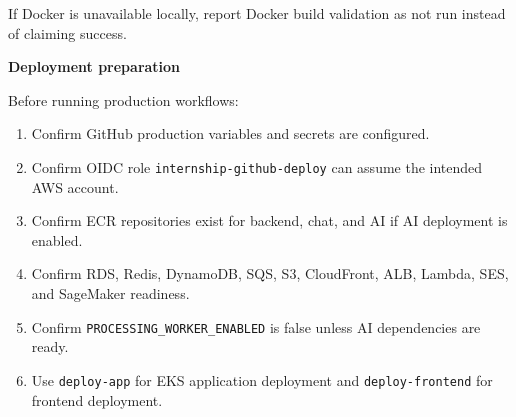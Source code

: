 \begin{Shaded}
\begin{Highlighting}[]
  \VariableTok{$(}\VariableTok{)}
 
 
 
  
\end{Highlighting}
\end{Shaded}

If Docker is unavailable locally, report Docker build validation as not
run instead of claiming success.

\vspace{0.5em}\noindent\textbf{Deployment preparation}\par

Before running production workflows:

\begin{enumerate}
\def\labelenumi{\arabic{enumi}.}
\tightlist
\item
  Confirm GitHub production variables and secrets are configured.
\item
  Confirm OIDC role \texttt{internship-\allowbreak{}github-\allowbreak{}deploy} can assume the
  intended AWS account.
\item
  Confirm ECR repositories exist for backend, chat, and AI if AI
  deployment is enabled.
\item
  Confirm RDS, Redis, DynamoDB, SQS, S3, CloudFront, ALB, Lambda, SES,
  and SageMaker readiness.
\item
  Confirm \texttt{PROCESSING\_\allowbreak{}WORKER\_\allowbreak{}ENABLED} is false unless AI
  dependencies are ready.
\item
  Use \texttt{deploy-\allowbreak{}app} for EKS application deployment and
  \texttt{deploy-\allowbreak{}frontend} for frontend deployment.
\end{enumerate}

